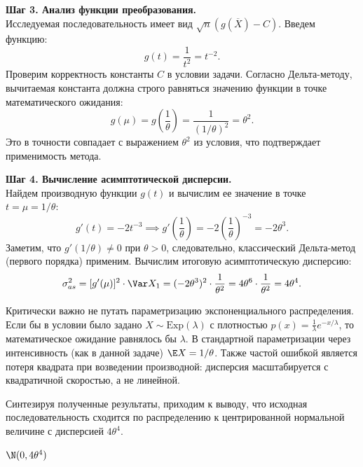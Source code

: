 \begin{Solution}
\textbf{Шаг 3. Анализ функции преобразования.}\\
Исследуемая последовательность имеет вид $\sqrt{n}(g(\overline{X}) - C)$. Введем функцию:
\[
g(t) = \frac{1}{t^2} = t^{-2}.
\]
Проверим корректность константы $C$ в условии задачи. Согласно Дельта-методу, вычитаемая константа должна строго равняться значению функции в точке математического ожидания:
\[
g(\mu) = g\left(\frac{1}{\theta}\right) = \frac{1}{(1/\theta)^2} = \theta^2.
\]
Это в точности совпадает с выражением $\theta^2$ из условия, что подтверждает применимость метода.

\textbf{Шаг 4. Вычисление асимптотической дисперсии.}\\
Найдем производную функции $g(t)$ и вычислим ее значение в точке $t = \mu = 1/\theta$:
\[
g'(t) = -2t^{-3} \implies g'\left(\frac{1}{\theta}\right) = -2\left(\frac{1}{\theta}\right)^{-3} = -2\theta^3.
\]
Заметим, что $g'(1/\theta) \neq 0$ при $\theta > 0$, следовательно, классический Дельта-метод (первого порядка) применим. Вычислим итоговую асимптотическую дисперсию:
\[
\sigma_{as}^2 = [g'(\mu)]^2 \cdot \Var X_1 = (-2\theta^3)^2 \cdot \frac{1}{\theta^2} = 4\theta^6 \cdot \frac{1}{\theta^2} = 4\theta^4.
\]

\begin{WarningBox}
Критически важно не путать параметризацию экспоненциального распределения. Если бы в условии было задано $X \sim \text{Exp}(\lambda)$ с плотностью $p(x) = \frac{1}{\lambda} e^{-x/\lambda}$, то математическое ожидание равнялось бы $\lambda$. В стандартной параметризации через интенсивность (как в данной задаче) $\E X = 1/\theta$. Также частой ошибкой является потеря квадрата при возведении производной: дисперсия масштабируется с квадратичной скоростью, а не линейной.
\end{WarningBox}

Синтезируя полученные результаты, приходим к выводу, что исходная последовательность сходится по распределению к центрированной нормальной величине с дисперсией $4\theta^4$.
\end{Solution}

\begin{Answer}
$\N(0, 4\theta^4)$
\end{Answer}

